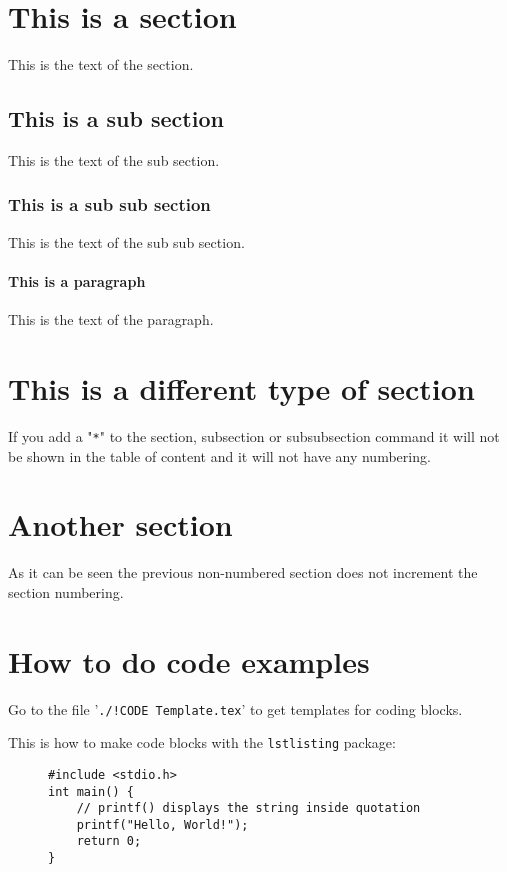 \section{This is a section}
This is the text of the section.

\subsection{This is a sub section}
This is the text of the sub section.


\subsubsection{This is a sub sub section}
This is the text of the sub sub section.

\paragraph{This is a paragraph}
This is the text of the paragraph.

\section*{This is a different type of section}
If you add a "\texttt{*}" to the section, subsection or subsubsection command
it will not be shown in the table of content and it will not have any numbering.

\section{Another section}
As it can be seen the previous non-numbered section does not increment the
section numbering.


\section{How to do code examples}

Go to the file '\texttt{./!CODE Template.tex}' to get templates for coding blocks.

This is how to make code blocks with the \texttt{lstlisting} package:
\begin{figure}
\begin{lstlisting}[label={lst:code-block},caption={This is the caption of the
    code example},style=CSharpStyle]
#include <stdio.h>
int main() {
    // printf() displays the string inside quotation
    printf("Hello, World!");
    return 0;
}
\end{lstlisting}
\end{figure}

